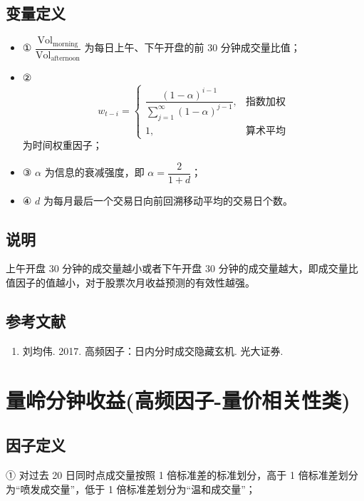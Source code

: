 \documentclass{article}
\begin{document}
\subsection{变量定义}
\begin{itemize}
    \item ① \( \dfrac{\mathrm{Vol}_{\mathrm{morning}}}{\mathrm{Vol}_{\mathrm{afternoon}}} \) 为每日上午、下午开盘的前 30 分钟成交量比值；
    \item ②
        \begin{equation*}
            w_{t-i} = 
            \begin{cases} 
                \dfrac{(1-\alpha)^{i-1}}{\sum_{j=1}^{\infty}(1-\alpha)^{j-1}}, & \text{指数加权} \\[6pt]
                1, & \text{算术平均}
            \end{cases}
        \end{equation*}
        为时间权重因子；
    \item ③ \( \alpha \) 为信息的衰减强度，即 \( \alpha = \dfrac{2}{1+d} \)；
    \item ④ \( d \) 为每月最后一个交易日向前回溯移动平均的交易日个数。
\end{itemize}

\subsection{说明}
上午开盘 30 分钟的成交量越小或者下午开盘 30 分钟的成交量越大，即成交量比值因子的值越小，对于股票次月收益预测的有效性越强。

\subsection{参考文献}
\begin{enumerate}
    \item 刘均伟. 2017. 高频因子：日内分时成交隐藏玄机. 光大证券.
\end{enumerate}

\section{量岭分钟收益(高频因子-量价相关性类)}

\subsection{因子定义}

① 对过去 20 日同时点成交量按照 1 倍标准差的标准划分，高于 1 倍标准差划分为“喷发成交量”，低于 1 倍标准差划分为“温和成交量”；
\end{document}
